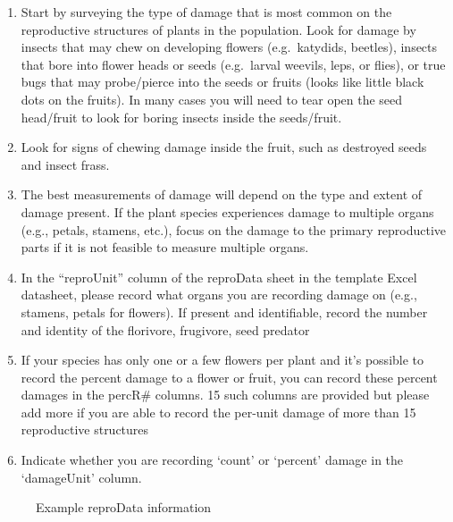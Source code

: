 \documentclass[
  letterpaper,
  DIV=11,
  numbers=noendperiod]{scrreprt}
\begin{document}
\begin{enumerate}
\def\labelenumi{\arabic{enumi}.}
\item
  Start by surveying the type of damage that is most common on the
  reproductive structures of plants in the population. Look for damage
  by insects that may chew on developing flowers (e.g.~katydids,
  beetles), insects that bore into flower heads or seeds (e.g.~larval
  weevils, leps, or flies), or true bugs that may probe/pierce into the
  seeds or fruits (looks like little black dots on the fruits). In many
  cases you will need to tear open the seed head/fruit to look for
  boring insects inside the seeds/fruit.
\item
  Look for signs of chewing damage inside the fruit, such as destroyed
  seeds and insect frass.
\item
  The best measurements of damage will depend on the type and extent of
  damage present. If the plant species experiences damage to multiple
  organs (e.g., petals, stamens, etc.), focus on the damage to the
  primary reproductive parts if it is not feasible to measure multiple
  organs.
\item
  In the ``reproUnit'' column of the reproData sheet in the template
  Excel datasheet, please record what organs you are recording damage on
  (e.g., stamens, petals for flowers). If present and identifiable,
  record the number and identity of the florivore, frugivore, seed
  predator
\item
  If your species has only one or a few flowers per plant and it's
  possible to record the percent damage to a flower or fruit, you can
  record these percent damages in the percR\# columns. 15 such columns
  are provided but please add more if you are able to record the
  per-unit damage of more than 15 reproductive structures
\item
  Indicate whether you are recording `count' or `percent' damage in the
  `damageUnit' column.
\end{enumerate}

\begin{figure}


\caption{\label{fig-reprotable}Example reproData information}

\end{figure}%
\end{document}
